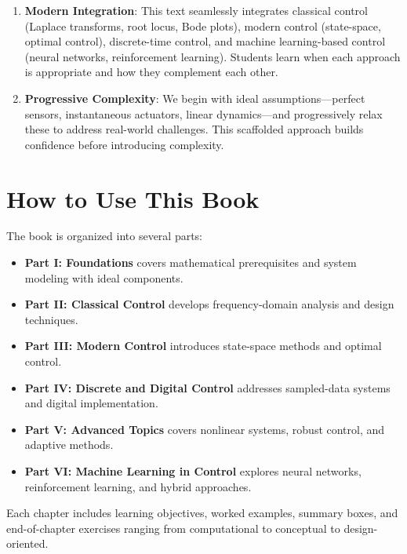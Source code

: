 {\begin{enumerate}
        \item \textbf{Modern Integration}: This text seamlessly integrates classical control (Laplace transforms, root locus, Bode plots), modern control (state-space, optimal control), discrete-time control, and machine learning-based control (neural networks, reinforcement learning). Students learn when each approach is appropriate and how they complement each other.

        \item \textbf{Progressive Complexity}: We begin with ideal assumptions---perfect sensors, instantaneous actuators, linear dynamics---and progressively relax these to address real-world challenges. This scaffolded approach builds confidence before introducing complexity.
    \end{enumerate}

    \section*{How to Use This Book}

    The book is organized into several parts:

    \begin{itemize}
        \item \textbf{Part I: Foundations} covers mathematical prerequisites and system modeling with ideal components.

        \item \textbf{Part II: Classical Control} develops frequency-domain analysis and design techniques.

        \item \textbf{Part III: Modern Control} introduces state-space methods and optimal control.

        \item \textbf{Part IV: Discrete and Digital Control} addresses sampled-data systems and digital implementation.

        \item \textbf{Part V: Advanced Topics} covers nonlinear systems, robust control, and adaptive methods.

        \item \textbf{Part VI: Machine Learning in Control} explores neural networks, reinforcement learning, and hybrid approaches.
    \end{itemize}

    Each chapter includes learning objectives, worked examples, summary boxes, and end-of-chapter exercises ranging from computational to conceptual to design-oriented.

}
